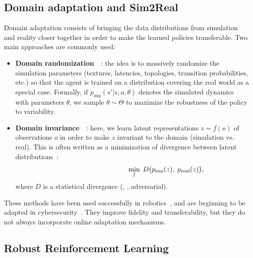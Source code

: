         \subsection{Domain adaptation and Sim2Real}

        \noindent
        Domain adaptation consists of bringing
        the data distributions from simulation and reality closer together
        in order to make the learned policies transferable.
        Two main approaches are commonly used:

        \begin{itemize}
          \item \textbf{Domain randomization}~\cite{tobin2017domain}~: the idea is to
                massively randomize the simulation parameters (textures, latencies, topologies,
                transition probabilities, etc.) so that the agent is trained on a distribution
                covering the real world as a special case. Formally, if
                $p_\text{sim}(s'|s,a,\theta)$ denotes the simulated
                dynamics with parameters $\theta$, we sample $\theta \sim \Theta$ to
                maximize the robustness of the policy to variability.
          \item \textbf{Domain invariance}~\cite{ganin2016domain}~: here, we learn
                latent representations $z = f(o)$ of observations $o$
                in order to make $z$ invariant to the domain
                (simulation vs. real). This is often written as a minimization
                of divergence between latent distributions~:
                \[
                  \hspace{3.5cm}\min_f \; D\big(p_\text{sim}(z), \; p_\text{real}(z)\big),
                \]
                where $D$ is a statistical divergence (, , adversarial).
        \end{itemize}

        \noindent
        These methods have been used successfully in robotics~\cite{tobin2017domain, peng2018sim},
        and are beginning to be adapted in cybersecurity~\cite{Standen2021}.
        They improve fidelity and transferability,
        but they do not always incorporate online adaptation mechanisms.

        \subsection{Robust Reinforcement Learning}

